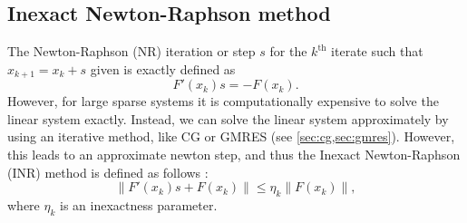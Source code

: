 \subsection{Inexact Newton-Raphson method}
The Newton-Raphson (NR) iteration or step $s$ for the $k^{\textrm{th}}$ iterate such that $x_{k+1} = x_k + s$ given is exactly defined as
\[
  F'(x_k)s = -F(x_k).
\]
However, for large sparse systems it is computationally expensive to solve the linear system exactly. Instead, we can solve the linear system approximately by using an iterative method, like CG or GMRES (see \cref{sec:cg,sec:gmres}). However, this leads to an approximate newton step, and thus the Inexact Newton-Raphson (INR) method is defined as follows \cite[Equation 6.1]{nonlinear_cg_Kelley_1995}:
\[
  \| F'(x_k)s + F(x_k) \| \leq \eta_k \| F(x_k) \|,
\]
where $\eta_k$ is an inexactness parameter.

